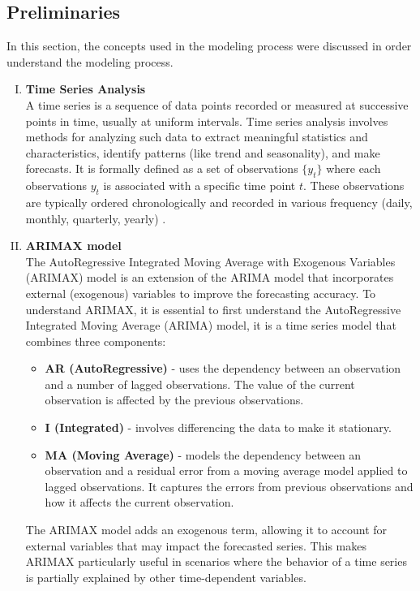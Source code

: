 \documentclass[11pt]{article}
\begin{document}
\subsection{Preliminaries}
In this section, the concepts used in the modeling process were discussed in order understand the modeling process.  
\begin{enumerate}[I. ]
    \item \textbf{Time Series Analysis}\\
    A time series is a sequence of data points recorded or measured at successive points in time, usually at uniform intervals. Time series analysis involves methods for analyzing such data to extract meaningful statistics and characteristics, identify patterns (like trend and seasonality), and make forecasts. It is formally defined as a set of observations $\{y_{t}\}$ where each observations $y_{t}$ is associated with a specific time point $t$. These observations are typically ordered chronologically and recorded in various frequency (daily, monthly, quarterly, yearly) \citep{boxjenkins}.
                
    \item \textbf{ARIMAX model}\\
    The AutoRegressive Integrated Moving Average with Exogenous Variables (ARIMAX) model is an extension of the ARIMA model that incorporates external (exogenous) variables to improve the forecasting accuracy. To understand ARIMAX, it is essential to first understand the AutoRegressive Integrated Moving Average (ARIMA) model, it is a time series model that combines three components: 

    \begin{itemize}
        \item \textbf{AR (AutoRegressive)} - uses the dependency between an observation and a number of lagged observations. The value of the current observation is affected by the previous observations. 
        \item  \textbf{I (Integrated) }- involves differencing the data to make it stationary.
        \item  \textbf{MA (Moving Average)} - models the dependency between an observation and a residual error from a moving average model applied to lagged observations. It captures the errors from previous observations and how it affects the current observation. 
    \end{itemize}
    The ARIMAX model adds an exogenous term, allowing it to account for external variables that may impact the forecasted series. This makes ARIMAX particularly useful in scenarios where the behavior of a time series is partially explained by other time-dependent variables. 



\end{enumerate}
\end{document}
